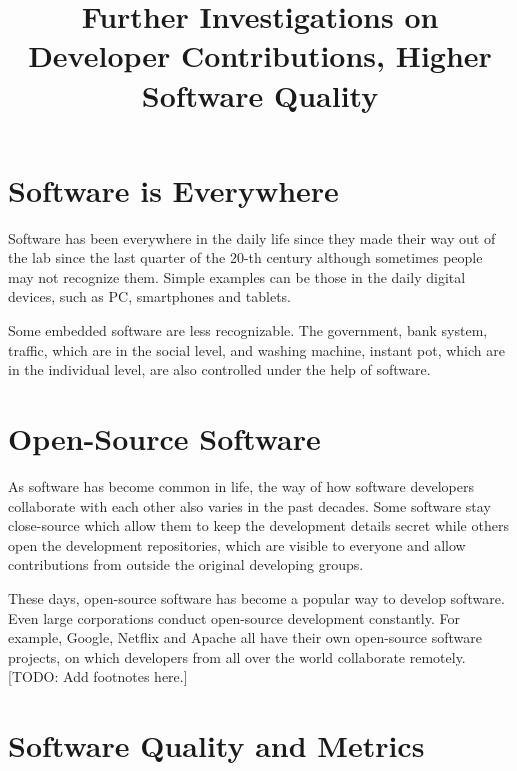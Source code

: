 \documentclass[10pt,conference]{IEEEtran}
\newcommand{\comment}[1]{{\leavevmode\color{comment}[TODO: #1]}\xspace}
\begin{document}
\title{Further Investigations on Developer Contributions, Higher Software Quality}

\author{
}


\maketitle

\section{Software is Everywhere}

Software has been everywhere in the daily life since they made their way out of the lab since the last quarter of the 20-th century although sometimes people may not recognize them.
Simple examples can be those in the daily digital devices, such as PC, smartphones and tablets. 

Some embedded software are less recognizable. 
The government, bank system, traffic, which are in the social level, and washing machine, instant pot, which are in the individual level, are also controlled under the help of software.

\section{Open-Source Software}
As software has become common in life, the way of how software developers collaborate with each other also varies in the past decades.
Some software stay close-source which allow them to keep the development details secret while others open the development repositories, which are visible to everyone and allow contributions from outside the original developing groups.

These days, open-source software has become a popular way to develop software. Even large corporations conduct open-source development constantly.
For example, Google, Netflix and Apache all have their own open-source software projects, on which developers from all over the world collaborate remotely. \comment{Add footnotes here.}

\section{Software Quality and Metrics}
\end{document}
